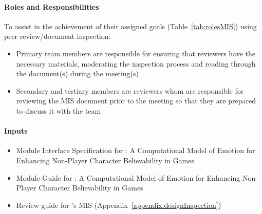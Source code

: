 \paragraph{Roles and Responsibilities} To assist in the achievement of their
assigned goals (Table~\ref{tab:rolesMIS}) using peer review/document inspection:
\begin{itemize}

    \item Primary team members are responsible for ensuring that reviewers have
    the necessary materials, moderating the inspection process and reading
    through the document(s) during the meeting(s)

    \item Secondary and tertiary members are reviewers whom are responsible for
    reviewing the MIS document prior to the meeting so that they are prepared to
    discuss it with the team

\end{itemize}

\paragraph{Inputs}
\begin{itemize}

    \item Module Interface Specification for \progname{}: A Computational Model
    of Emotion for Enhancing Non-Player Character Believability in Games

    \item Module Guide for \progname{}: A Computational Model of Emotion for
    Enhancing Non-Player Character Believability in Games

    \item Review guide for \progname{}'s MIS
    (Appendix~\ref{appendix:designInspection})

\end{itemize}

